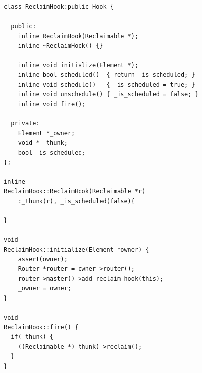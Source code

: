 \documentclass[a4paper]{article}
\begin{document}
\begin{lstlisting}[float=tph, caption=The ReclaimHook class which allows elements to schedule reclamations, label=lst:reclaimhook]
class ReclaimHook:public Hook {

  public:
    inline ReclaimHook(Reclaimable *);
    inline ~ReclaimHook() {}

    inline void initialize(Element *);
    inline bool scheduled()  { return _is_scheduled; }
    inline void schedule()   { _is_scheduled = true; } 
    inline void unschedule() { _is_scheduled = false; }
    inline void fire();

  private:
    Element *_owner;
    void * _thunk;
    bool _is_scheduled;    
};

inline
ReclaimHook::ReclaimHook(Reclaimable *r)
    :_thunk(r), _is_scheduled(false){

}

void
ReclaimHook::initialize(Element *owner) {
    assert(owner);
    Router *router = owner->router();    
    router->master()->add_reclaim_hook(this);
    _owner = owner;
}

void
ReclaimHook::fire() {
  if(_thunk) {
    ((Reclaimable *)_thunk)->reclaim();
  }
}
\end{lstlisting}
\end{document}
